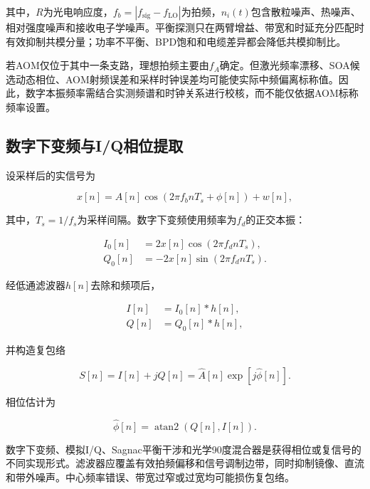 其中，$R$为光电响应度，$f_b=|f_{\mathrm{sig}}-f_{\mathrm{LO}}|$为拍频，$n_i(t)$包含散粒噪声、热噪声、相对强度噪声和接收电子学噪声。平衡探测只在两臂增益、带宽和时延充分匹配时有效抑制共模分量；功率不平衡、BPD饱和和电缆差异都会降低共模抑制比\cite{lu2010distributed,pan2011phase,liokumovich2015fundamentals}。

若AOM仅位于其中一条支路，理想拍频主要由$f_A$确定。但激光频率漂移、SOA候选动态相位、AOM射频误差和采样时钟误差均可能使实际中频偏离标称值。因此，数字本振频率需结合实测频谱和时钟关系进行校核，而不能仅依据AOM标称频率设置。

\subsection{数字下变频与I/Q相位提取}

设采样后的实信号为

\begin{equation}
x[n]
=
A[n]\cos\!\left(2\pi f_b nT_s+\phi[n]\right)+w[n],
\label{eq:sampled_if}
\end{equation}

其中，$T_s=1/f_s$为采样间隔。数字下变频使用频率为$f_d$的正交本振：

\begin{align}
I_0[n]&=2x[n]\cos(2\pi f_d nT_s),\\
Q_0[n]&=-2x[n]\sin(2\pi f_d nT_s).
\end{align}

经低通滤波器$h[n]$去除和频项后，

\begin{align}
I[n]&=I_0[n]*h[n],\\
Q[n]&=Q_0[n]*h[n],
\end{align}

并构造复包络

\begin{equation}
S[n]=I[n]+jQ[n]=\hat A[n]\exp\!\left[j\hat\phi[n]\right].
\label{eq:complex_envelope}
\end{equation}

相位估计为

\begin{equation}
\hat\phi[n]
=
\operatorname{atan2}\!\left(Q[n],I[n]\right).
\label{eq:atan2}
\end{equation}

数字下变频、模拟I/Q、Sagnac平衡干涉和光学90度混合器是获得相位或复信号的不同实现形式\cite{fu2018iq,jiang2019analog,zhong2021sagnac}。滤波器应覆盖有效拍频偏移和信号调制边带，同时抑制镜像、直流和带外噪声。中心频率错误、带宽过窄或过宽均可能损伤复包络\cite{zhang2025if,zhu2024downsampling}。

